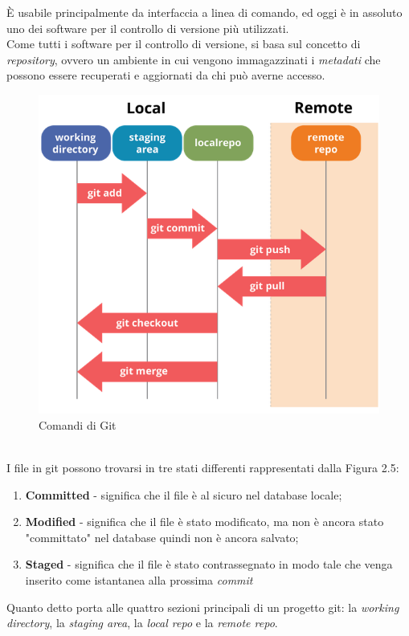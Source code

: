 È usabile principalmente da interfaccia a linea di comando, ed oggi è in assoluto uno dei software per il controllo di versione più utilizzati.\\
Come tutti i software per il controllo di versione, si basa sul concetto di \emph{\gls{repository}}\glsfirstoccur\cite{gitSite}, ovvero un ambiente in cui vengono immagazzinati i \emph{\gls{metadati}}\glsfirstoccur\cite{gitGuida} che possono essere recuperati e aggiornati da chi può averne accesso.
\begin{figure}[h]
	\centering
	\includegraphics[scale=0.5]{immagini/gitCommands}
	\caption{Comandi di Git \cite{gitGuida}}
\end{figure}
\\
I file in \gls{git} possono trovarsi in tre stati differenti rappresentati dalla Figura 2.5:
\begin{enumerate}
	\item \textbf{Committed} - significa che il file è al sicuro nel database locale;
	\item \textbf{Modified} - significa che il file è stato modificato, ma non è ancora stato "committato" nel database quindi non è ancora salvato;
	\item \textbf{Staged} - significa che il file è stato contrassegnato in modo tale che venga inserito come istantanea alla prossima \emph{\gls{commit}}\glsfirstoccur
\end{enumerate}
Quanto detto porta alle quattro sezioni principali di un progetto \gls{git}: la \textit{working directory}, la \textit{staging area}, la \textit{local repo} e la \textit{remote repo}.

